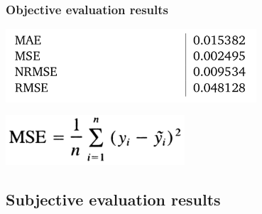 \documentclass[a4paper,9pt]{beamer}
\theoremstyle{mytheoremstyle}
\begin{document}
\begin{frame}
\frametitle{Objective evaluation results}
\begin{center}
  \includegraphics[width=0.7\textwidth]{res/mse}
\end{center}
\begin{center}
  \includegraphics[width=0.5\textwidth]{res/mse_form}
\end{center}
\end{frame}


\subsection{Subjective evaluation results}
\end{document}
